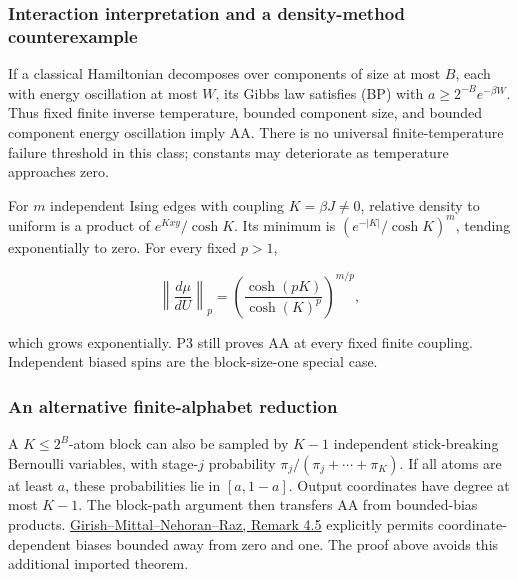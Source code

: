 \subsubsection{Interaction interpretation and a density-method
counterexample}\label{proof:positive_structure:interaction-interpretation-and-a-density-method-counterexample}

If a classical Hamiltonian decomposes over components of size at most
\(B\), each with energy oscillation at most \(W\), its Gibbs law
satisfies (BP) with \(a\ge 2^{-B}e^{-\beta  W}\). Thus fixed finite
inverse temperature, bounded component size, and bounded component
energy oscillation imply AA. There is no universal finite-temperature
failure threshold in this class; constants may deteriorate as
temperature approaches zero.

For \(m\) independent Ising edges with coupling \(K=\beta  J \ne 0\),
relative density to uniform is a product of \(e^{Kxy}/\cosh  K\). Its
minimum is \((e^{-|K|}/\cosh  K)^m\), tending exponentially to zero. For
every fixed \(p>1\),

\[
\left\|\frac{d\mu}{dU}\right\|_p
=\left(\frac{\cosh(pK)}{\cosh(K)^p}\right)^{m/p},
\]

which grows exponentially. P3 still proves AA at every fixed finite
coupling. Independent biased spins are the block-size-one special case.

\subsubsection{An alternative finite-alphabet
reduction}\label{proof:positive_structure:an-alternative-finite-alphabet-reduction}

A \(K\le 2^B\)-atom block can also be sampled by \(K-1\) independent
stick-breaking Bernoulli variables, with stage-\(j\) probability
\(\pi_j/(\pi_j+\cdots+\pi_K)\). If all atoms are at least \(a\), these
probabilities lie in \([a,1-a]\). Output coordinates have degree at most
\(K-1\). The block-path argument then transfers AA from bounded-bias
products.
\href{https://arxiv.org/html/2609.35327v1}{Girish--Mittal--Nehoran--Raz,
Remark 4.5} explicitly permits coordinate-dependent biases bounded away
from zero and one. The proof above avoids this additional imported
theorem.
